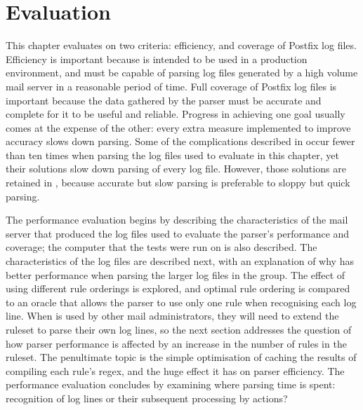 \chapter{Evaluation}

\label{Evaluation}

\renewcommand{\figurename}{Graph}

\addtolength{\tabcolsep}{-2pt}

This chapter evaluates \parsername{} on two criteria: efficiency, and
coverage of  Postfix log files.  Efficiency is important because
\parsername{} is intended to be used in a production environment, and must
be capable of parsing log files generated by a high volume mail server in a
reasonable period of time.  Full coverage of Postfix log files is important
because the data gathered by the parser must be accurate and complete for
it to be useful and reliable.  Progress in achieving one goal usually comes
at the expense of the other: every extra measure implemented to improve
accuracy slows down parsing.  Some of the complications described in
 occur fewer than ten times when parsing the
\numberOFlogFILES{} log files used to evaluate \parsername{} in this
chapter, yet their solutions slow down parsing of every log file.  However,
those solutions are retained in \parsername{}, because accurate but slow
parsing is preferable to sloppy but quick parsing.

The performance evaluation begins by describing the characteristics of the
mail server that produced the \numberOFlogFILES{} log files used to
evaluate the parser's performance and coverage; the computer that the tests
were run on is also described.  The characteristics of the
\numberOFlogFILES{} log files are described next, with an explanation of
why \parsername{} has better performance when parsing the larger log files
in the group.  The effect of using different rule orderings is explored,
and optimal rule ordering is compared to an oracle that allows the parser
to use only one rule when recognising each log line.  When \parsername{} is
used by other mail administrators, they will need to extend the ruleset to
parse their own log lines, so the next section addresses the question of
how parser performance is affected by an increase in the number of rules in
the ruleset.  The penultimate topic is the simple optimisation of caching
the results of compiling each rule's regex, and the huge effect it has on
parser efficiency.  The performance evaluation concludes by examining where
parsing time is spent: recognition of log lines or their subsequent
processing by actions?

